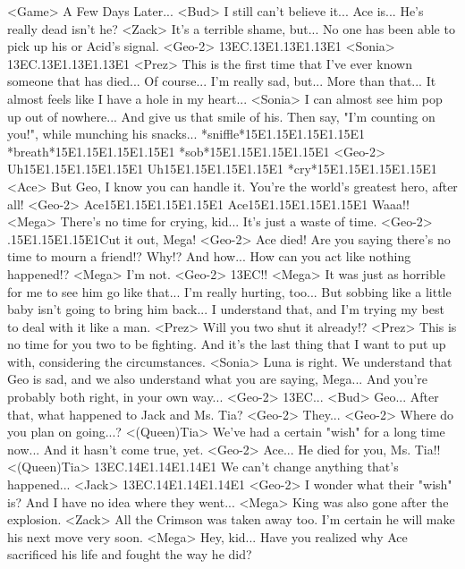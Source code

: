 <Game> A Few Days Later... 
<Bud> I still can't believe it... 
Ace is... He's really dead isn't he? 
<Zack> It's a terrible shame, but... 
No one has been able to pick up his or Acid's signal. 
<Geo-2> {13}{EC}.{13}{E1}.{13}{E1}.{13}{E1} 
<Sonia> {13}{EC}.{13}{E1}.{13}{E1}.{13}{E1} 
<Prez> This is the first time that I've ever known someone that has died... 
Of course... I'm really sad, but... 
More than that... 
It almost feels like I have a hole in my heart... 
<Sonia> I can almost see him pop up out of nowhere... 
And give us that smile of his. Then say, "I'm counting 
on you!", while munching his snacks... 
*sniffle*{15}{E1}.{15}{E1}.{15}{E1}.{15}{E1} *breath*{15}{E1}.{15}{E1}.{15}{E1}.{15}{E1} 
*sob*{15}{E1}.{15}{E1}.{15}{E1}.{15}{E1} 
<Geo-2> Uh{15}{E1}.{15}{E1}.{15}{E1}.{15}{E1} Uh{15}{E1}.{15}{E1}.{15}{E1}.{15}{E1} 
*cry*{15}{E1}.{15}{E1}.{15}{E1}.{15}{E1} 
<Ace> But Geo, I know you can handle it. 
You're the world's greatest hero, after all! 
<Geo-2> Ace{15}{E1}.{15}{E1}.{15}{E1}.{15}{E1} 
Ace{15}{E1}.{15}{E1}.{15}{E1}.{15}{E1} 
Waaa!! 
<Mega> There's no time for crying, kid... 
It's just a waste of time. 
<Geo-2> .{15}{E1}.{15}{E1}.{15}{E1}Cut it out, Mega! 
<Geo-2> Ace died! 
Are you saying there's no time to mourn a friend!? 
Why!? 
And how... How can you act like nothing happened!? 
<Mega> I'm not. 
<Geo-2> {13}{EC}!! 
<Mega> It was just as horrible for me to see him go like that... I'm really hurting, too... 
But sobbing like a little baby isn't going to bring him back... 
I understand that, and I'm trying my best to deal with it like a man. 
<Prez> Will you two shut it already!? 
<Prez> This is no time for you two to be fighting. 
And it's the last thing that I want to put up with, considering the circumstances. 
<Sonia> Luna is right. 
We understand that Geo is sad, and we also understand what you are saying, Mega... 
And you're probably both right, in your own way... 
<Geo-2> {13}{EC}... 
<Bud> Geo... After that, what happened to Jack and Ms. Tia? 
<Geo-2> They... 
<Geo-2> Where do you plan on going...? 
<(Queen)Tia> We've had a certain "wish" for a long time now... 
And it hasn't come true, yet. 
<Geo-2> Ace... He died for you, Ms. Tia!! 
<(Queen)Tia> {13}{EC}.{14}{E1}.{14}{E1}.{14}{E1} 
We can't change anything that's happened... 
<Jack> {13}{EC}.{14}{E1}.{14}{E1}.{14}{E1} 
<Geo-2> I wonder what their "wish" is? 
And I have no idea where they went... 
<Mega> King was also gone after the explosion. 
<Zack> All the Crimson was taken away too. 
I'm certain he will make his next move very soon. 
<Mega> Hey, kid... 
Have you realized why Ace sacrificed his life and fought the way he did? 
